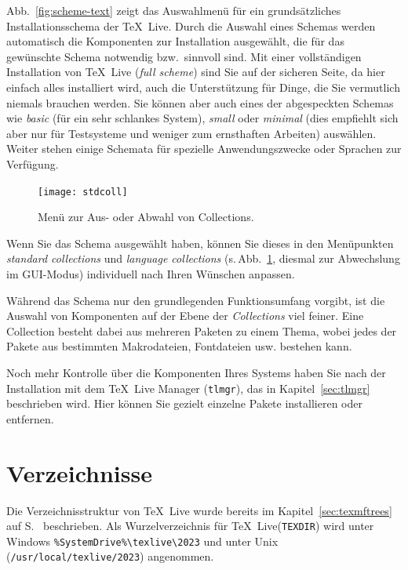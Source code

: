 \documentclass[12pt,ngerman,a4paper,fullparskip]{report}
\newcommand{\TL}{\TeX\ Live\xspace}
\newcommand{\prog}[1]{\texttt{#1}}
\newcommand{\dirname}[1]{\texttt{#1}}
\begin{document}
\noindent Abb.~\ref{fig:scheme-text} zeigt das Auswahlmenü für ein grundsätzliches Installationsschema der
\TL. Durch die Auswahl eines Schemas werden automatisch die Komponenten zur Installation ausgewählt, die
für das gewünschte Schema notwendig bzw.\ sinnvoll sind. Mit einer vollständigen Installation von \TL
(\emph{full scheme}) sind Sie auf der sicheren Seite, da hier einfach alles installiert wird, auch die Unterstützung für Dinge, die Sie vermutlich niemals brauchen werden. Sie können aber auch eines der abgespeckten Schemas wie \emph{basic} (für ein sehr schlankes System), \emph{small}
oder \emph{minimal} (dies empfiehlt sich aber nur für Testsysteme und weniger zum ernsthaften Arbeiten)
auswählen. Weiter stehen einige Schemata für spezielle Anwendungszwecke oder Sprachen zur Verfügung.

\begin{figure}[tb]
\begin{center}
\texttt{[image: stdcoll]}
\caption{Menü zur Aus- oder Abwahl von Collections.}\label{fig:collections-gui}
\end{center}
\end{figure}

Wenn Sie das Schema ausgewählt haben, können Sie dieses in den Menüpunkten \emph{standard collections} und
\emph{language collections} (s.\,Abb.~\ref{fig:collections-gui}, diesmal zur Abwechslung im GUI-Modus)
individuell nach Ihren Wünschen anpassen.

Während das Schema nur den grundlegenden Funktionsumfang vorgibt, ist die Auswahl von Komponenten auf der
Ebene der \emph{Collections} viel feiner. Eine Collection besteht dabei aus mehreren Paketen zu einem Thema,
wobei jedes der Pakete aus bestimmten Makrodateien, Fontdateien usw. bestehen kann.

Noch mehr Kontrolle über die Komponenten Ihres Systems haben Sie nach der Installation mit dem \TeX\ Live Manager (\prog{tlmgr}), das in Kapitel~\ref{sec:tlmgr} beschrieben wird. Hier können Sie gezielt einzelne Pakete installieren oder entfernen.

\section{Verzeichnisse}\label{sec:directories}


Die Verzeichnisstruktur von \TL wurde bereits im Kapitel~\ref{sec:texmftrees} auf S.~\pageref{sec:texmftrees}
beschrieben. Als Wurzelverzeichnis für \TL (\dirname{TEXDIR}) wird unter Windows
\verb|%SystemDrive%\texlive\2023| und unter Unix (\dirname{/usr/local/texlive/2023}) angenommen. 
\end{document}
